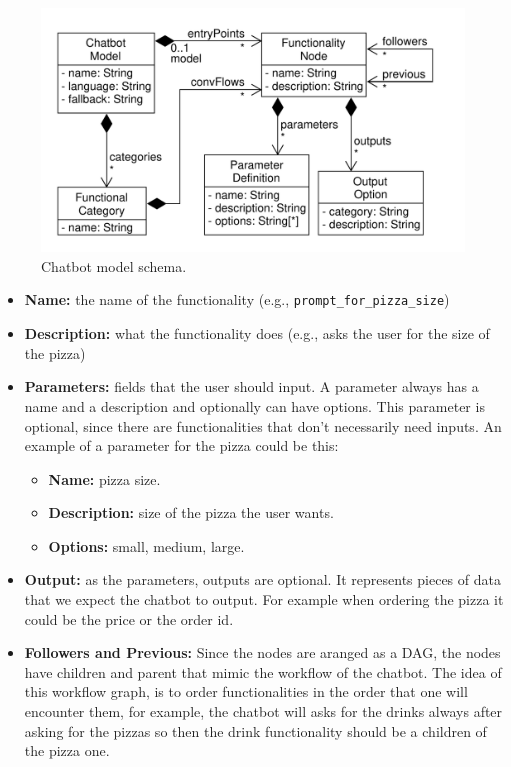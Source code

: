 \begin{figure}[htpb]
  \centering
  \includegraphics[width=\linewidth]{figures/TRACER_chatbot_model.pdf}
  \caption{
    Chatbot model schema.
  }
  \label{fig:functionality_node}
\end{figure}

\begin{itemize}
  \item \textbf{Name:} the name of the functionality (e.g., \texttt{prompt\_for\_pizza\_size})
  \item \textbf{Description:} what the functionality does (e.g., asks the user for the size of the pizza)
  \item \textbf{Parameters:} fields that the user should input.
    A parameter always has a name and a description
    and optionally can have options.
    This parameter is optional,
    since there are functionalities that don't necessarily need inputs.
    An example of a parameter for the pizza could be this:
    \begin{itemize}
      \item \textbf{Name:} pizza size.
      \item \textbf{Description:} size of the pizza the user wants.
      \item \textbf{Options:} small, medium, large.
    \end{itemize}
  \item \textbf{Output:} as the parameters, outputs are optional.
    It represents pieces of data that we expect the chatbot to output.
    For example when ordering the pizza it could be the price or the order id.
  \item \textbf{Followers and Previous:}
    Since the nodes are aranged as a \ac{DAG},
    the nodes have children and parent
    that mimic the workflow of the chatbot.
    The idea of this workflow graph,
    is to order functionalities in the order that one will encounter them,
    for example, the chatbot will asks for the drinks always after asking for the pizzas
    so then the drink functionality should be a children of the pizza one.
\end{itemize}

